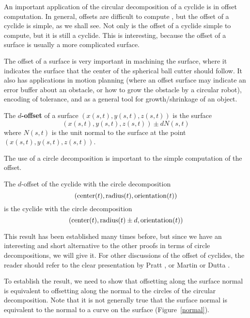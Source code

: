 An important application of the circular decomposition of a cyclide
is in offset computation.
In general, offsets are difficult to compute \cite{FAR86,FN90b,FN90a},
but the offset of a cyclide is simple, as we shall see.
Not only is the offset of a cyclide simple to compute, but
it is still a cyclide.
This is interesting, because the offset of a surface is usually a 
more complicated surface.

The offset of a surface is very important in machining the surface,
where it indicates the surface that the center of the spherical ball cutter
should follow.
It also has applications in motion planning (where an offset surface
may indicate an error buffer about an obstacle, or how to grow the obstacle
by a circular robot), encoding of tolerance, and as a general tool for
growth/shrinkage of an object.

\begin{defn2}
The {\bf $d$-offset} of a surface $(x(s,t),y(s,t),z(s,t))$ is the surface
\[ 
	(x(s,t),y(s,t),z(s,t)) \pm d N(s,t)
\]
where $N(s,t)$ is the unit normal
to the surface at the point $(x(s,t),y(s,t),z(s,t))$.
\end{defn2}

The use of a circle decomposition is important to the 
simple computation of the offset.


\begin{theorem}
\label{thm:offset}
The $d$-offset of the cyclide 
with the circle decomposition
\[ ({\rm center}(t), {\rm radius}(t), {\rm orientation}(t)) \]
is the cyclide with the circle decomposition
\[ ({\rm center}(t), {\rm radius}(t) \pm d, {\rm orientation}(t)) \]
\end{theorem}

This result has been established many times before,
but since we have an interesting and short alternative to the other proofs
in terms of circle decompositions, we will give it.
For other discussions of the offset of cyclides, 
the reader should refer to the clear presentation by Pratt \cite{P89}, 
or Martin \cite{MAR82} or Dutta \cite{Dutta89}.

To establish the result, 
we need to show that offsetting along the surface normal is equivalent
to offsetting along the normal to the circles of the circular decomposition.
Note that it is not generally true that the surface normal is equivalent 
to the normal to a curve on the surface
(Figure~\ref{normal}).

